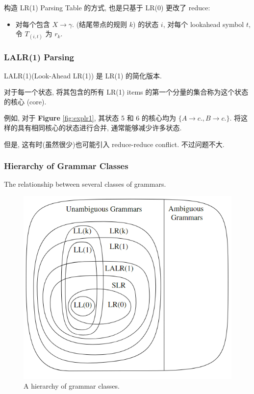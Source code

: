 

构造 LR(1) Parsing Table 的方式, 也是只基于 LR(0) 更改了 reduce:
\begin{itemize}
    \item 对每个包含 $X\to \gamma.$ (结尾带点的规则 $k$) 的状态 $i$, 对每个 lookahead symbol $t$, 令 $T_{(i,t)}$ 为 $r_k$.
\end{itemize}

\subsubsection{LALR(1) Parsing}
LALR(1)(Look-Ahead LR(1)) 是 LR(1) 的简化版本. 

对于每一个状态, 将其包含的所有 LR(1) items 的第一个分量的集合称为这个状态的核心 (core). 

例如, 对于 \textbf{Figure} \ref{fig:explr1}, 其状态 5 和 6 的核心均为 $\{A\to c., B\to c.\}$. 将这样的具有相同核心的状态进行合并, 通常能够减少许多状态. 

但是, 这有时(虽然很少)也可能引入 reduce-reduce conflict. 不过问题不大. 



\subsubsection{Hierarchy of Grammar Classes}
The relationship between several classes of grammars. 
\begin{figure}[H]
    \centering
    \includegraphics[width=0.6\linewidth]{pic/CP3/A hierarchy of grammar classes.}
    \caption{A hierarchy of grammar classes.}
\end{figure}

